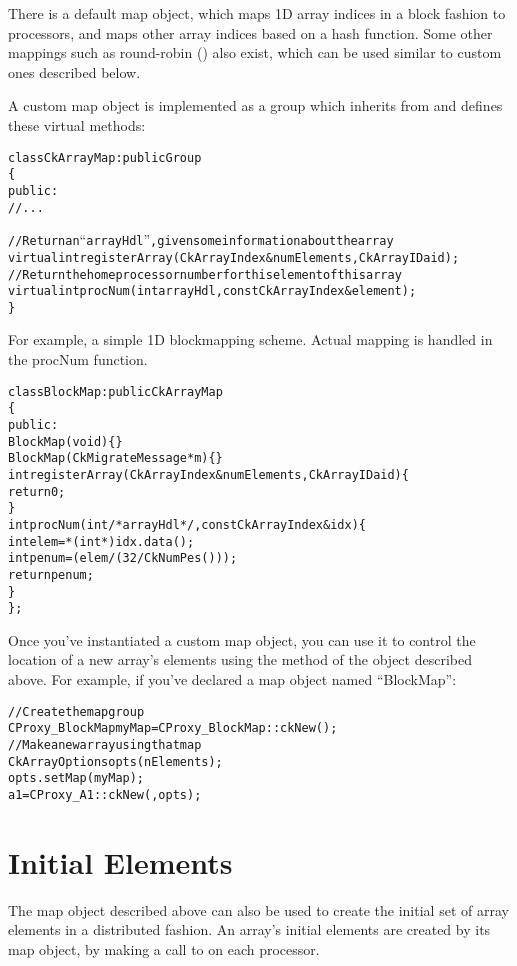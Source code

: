 There is a default map object, which maps 1D array indices
in a block fashion to processors, and maps other array
indices based on a hash function. Some other mappings such as round-robin
() also exist, which can be used
similar to custom ones described below.

A custom map object is implemented as a group which inherits from
 and defines these virtual methods:

\begin{alltt}
class CkArrayMap : public Group
\{
public:
  //...
  
  //Return an ``arrayHdl'', given some information about the array
  virtual int registerArray(CkArrayIndex& numElements,CkArrayID aid);
  //Return the home processor number for this element of this array
  virtual int procNum(int arrayHdl,const CkArrayIndex &element);
\}
\end{alltt}

For example, a simple 1D blockmapping scheme.  Actual mapping is
handled in the procNum function.

\begin{alltt}
class BlockMap : public CkArrayMap 
\{
 public:
  BlockMap(void) \{\}
  BlockMap(CkMigrateMessage *m)\{\}
  int registerArray(CkArrayIndex& numElements,CkArrayID aid) \{
    return 0;
  \}
  int procNum(int /*arrayHdl*/,const CkArrayIndex &idx) \{
    int elem=*(int *)idx.data();
    int penum =  (elem/(32/CkNumPes()));
    return penum;
  \}
\};

\end{alltt}
Once you've instantiated a custom map object, you can use it to
control the location of a new array's elements using the
 method of the  object described above.
For example, if you've declared a map object named ``BlockMap'':

\begin{alltt}
//Create the map group
  CProxy_BlockMap myMap=CProxy_BlockMap::ckNew();
//Make a new array using that map
  CkArrayOptions opts(nElements);
  opts.setMap(myMap);
  a1=CProxy_A1::ckNew(,opts);
\end{alltt}



\section{Initial Elements}
\label{array initial}

The map object described above can also be used to create
the initial set of array elements in a distributed fashion.
An array's initial elements are created by its map object,
by making a call to  on each processor.

